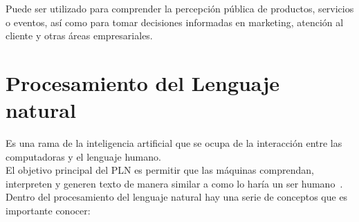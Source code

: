 Puede ser utilizado para comprender la percepción pública 
de productos, servicios o eventos, así como para tomar 
decisiones informadas en marketing, atención al cliente y 
otras áreas empresariales.

\section{Procesamiento del Lenguaje natural}
Es una rama de la inteligencia artificial que se ocupa de la interacción 
entre las computadoras y el lenguaje humano. \\
El objetivo principal del PLN es permitir que las máquinas comprendan, 
interpreten y generen texto de manera similar a como lo haría un ser humano~\cite{Moreno2018}.\\
Dentro del procesamiento del lenguaje natural hay una serie de conceptos que es importante conocer:

